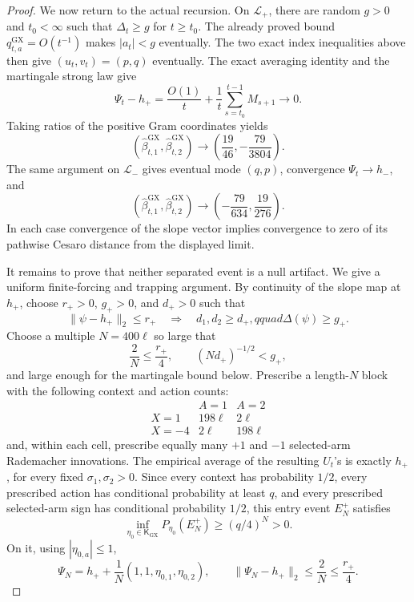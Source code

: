 \documentclass{article}
\begin{document}
\begin{proof}
We now return to the actual recursion.  On \(\mathcal L_+\), there are random \(g>0\) and \(t_0<\infty\) such that \(\Delta_t\ge g\) for \(t\ge t_0\).  The already proved bound \(q^{\mathrm{GX}}_{t,a}=O(t^{-1})\) makes \(|a_t|<g\) eventually.  The two exact index inequalities above then give \((u_t,v_t)=(p,q)\) eventually.  The exact averaging identity and the martingale strong law give
\[
 \Psi_t-h_+
 =\frac{O(1)}t+\frac1t\sum_{s=t_0}^{t-1}M_{s+1}\longrightarrow0.
\]
Taking ratios of the positive Gram coordinates yields
\[
 (\widehat\beta^{\mathrm{GX}}_{t,1},
   \widehat\beta^{\mathrm{GX}}_{t,2})
 \longrightarrow
 \left(\frac{19}{46},-\frac{79}{3804}\right).
\]
The same argument on \(\mathcal L_-\) gives eventual mode \((q,p)\), convergence \(\Psi_t\to h_-\), and
\[
 (\widehat\beta^{\mathrm{GX}}_{t,1},
   \widehat\beta^{\mathrm{GX}}_{t,2})
 \longrightarrow
 \left(-\frac{79}{634},\frac{19}{276}\right).
\]
In each case convergence of the slope vector implies convergence to zero of its pathwise Cesaro distance from the displayed limit.

It remains to prove that neither separated event is a null artifact.  We give a uniform finite-forcing and trapping argument.  By continuity of the slope map at \(h_+\), choose \(r_+>0\), \(g_+>0\), and \(d_+>0\) such that
\[
 \|\psi-h_+\|_2\le r_+
 \quad\Longrightarrow\quad
 d_1,d_2\ge d_+,qquad \Delta(\psi)\ge g_+.
\]
Choose a multiple \(N=400\ell\) so large that
\[
 \frac2N\le\frac{r_+}{4},
 \qquad
 (Nd_+)^{-1/2}<g_+,
\]
and large enough for the martingale bound below.  Prescribe a length-\(N\) block with the following context and action counts:
\[
 \begin{array}{c|cc}
 &A=1&A=2\\ \hline
 X=1&198\ell&2\ell\\
 X=-4&2\ell&198\ell
 \end{array}
\]
and, within each cell, prescribe equally many \(+1\) and \(-1\) selected-arm Rademacher innovations.  The empirical average of the resulting \(U_t\)'s is exactly \(h_+\), for every fixed \(\sigma_1,\sigma_2>0\).  Since every context has probability \(1/2\), every prescribed action has conditional probability at least \(q\), and every prescribed selected-arm sign has conditional probability \(1/2\), this entry event \(E_N^+\) satisfies
\[
 \inf_{\eta_0\in\mathsf K_{\mathrm{GX}}}
 P_{\eta_0}(E_N^+)\ge(q/4)^N>0.
\]
On it, using \(|\eta_{0,a}|\le1\),
\[
 \Psi_N=h_++\frac1N(1,1,\eta_{0,1},\eta_{0,2}),
 \qquad
 \|\Psi_N-h_+\|_2\le\frac2N\le\frac{r_+}{4}.
\]


\end{proof}
\end{document}
